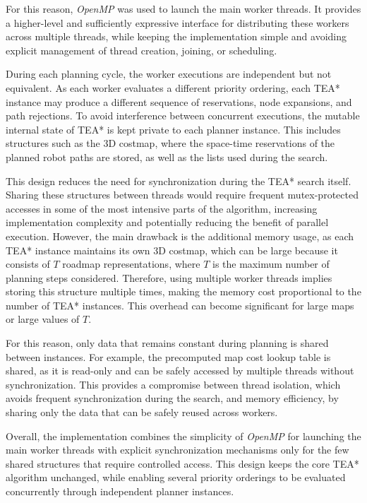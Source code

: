 For this reason, \textit{OpenMP} was used to launch the main worker threads. It provides a
higher-level and sufficiently expressive interface for distributing these workers across multiple
threads, while keeping the implementation simple and avoiding explicit management of thread
creation, joining, or scheduling.

During each planning cycle, the worker executions are independent but not equivalent. As each
worker evaluates a different priority ordering, each TEA* instance may produce a different sequence
of reservations, node expansions, and path rejections. To avoid interference between concurrent
executions, the mutable internal state of TEA* is kept private to each planner instance. This includes
structures such as the 3D costmap, where the space-time reservations of the planned robot paths are
stored, as well as the lists used during the search.

This design reduces the need for synchronization during the TEA* search itself. Sharing these
structures between threads would require frequent mutex-protected accesses in some of the most
intensive parts of the algorithm, increasing implementation complexity and potentially reducing
the benefit of parallel execution. However, the main drawback is the additional memory usage,
as each TEA* instance maintains its own 3D costmap, which can be large because it consists of
\(T\) roadmap representations, where \(T\) is the maximum number of planning steps considered.
Therefore, using multiple worker threads implies storing this structure multiple times, making the
memory cost proportional to the number of TEA* instances. This overhead can become significant
for large maps or large values of \(T\).

For this reason, only data that remains constant during planning is shared between instances. For
example, the precomputed map cost lookup table is shared, as it is read-only and can be safely
accessed by multiple threads without synchronization. This provides a compromise between thread
isolation, which avoids frequent synchronization during the search, and memory efficiency, by
sharing only the data that can be safely reused across workers.

Overall, the implementation combines the simplicity of \textit{OpenMP} for launching the main worker
threads with explicit synchronization mechanisms only for the few shared structures that require
controlled access. This design keeps the core TEA* algorithm unchanged, while enabling several
priority orderings to be evaluated concurrently through independent planner instances.


